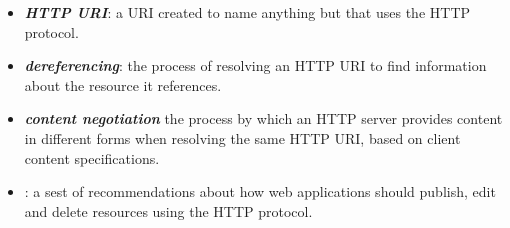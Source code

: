 \begin{itemize}
\item
  \emph{\textbf{HTTP URI}}: a URI created to name anything but that
  uses the HTTP protocol.
\item
  \emph{\textbf{dereferencing}}: the process of resolving an HTTP URI to find information about 
  the resource it references. 
\item
  \emph{\textbf{content negotiation}} the process by which an HTTP server provides content in different forms when 
  resolving the
  same HTTP URI, based on client content specifications.  

\item 
  \emph{}: a sest of recommendations about how web applications should 
  publish, edit and delete resources using the HTTP protocol.
\end{itemize}

